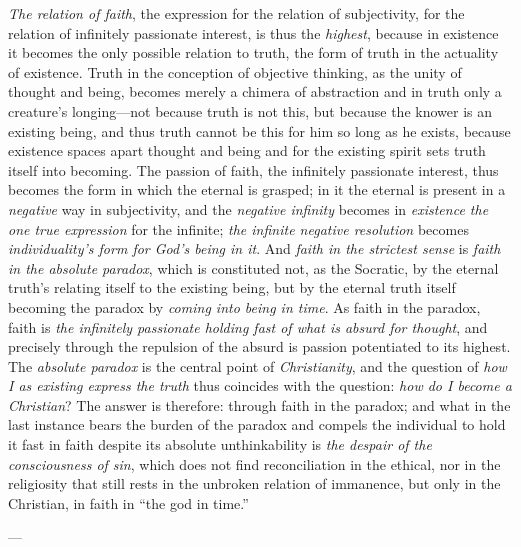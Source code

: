\documentclass[12pt,a4paper]{book}
\begin{document}
\emph{The relation of faith}, the expression for the relation of subjectivity,
for the relation of infinitely passionate interest, is thus the
\emph{highest}, because in existence it becomes the only possible relation to
truth, the form of truth in the actuality of existence. Truth in the
conception of objective thinking, as the unity of thought and being,
becomes merely a chimera of abstraction and in truth only a creature's
longing---not because truth is not this, but because the knower is an
existing being, and thus truth cannot be this for him so long as he
exists, because existence spaces apart thought and being and for the
existing spirit sets truth itself into becoming. The passion of faith,
the infinitely passionate interest, thus becomes the form in which the
eternal is grasped; in it the eternal is present in a \emph{negative} way in
subjectivity, and the \emph{negative infinity} becomes in \emph{existence the one
true expression} for the infinite; \emph{the infinite negative resolution}
becomes \emph{individuality's form for God's being in it}. And \emph{faith in the
strictest sense} is \emph{faith in the absolute paradox}, which is constituted
not, as the Socratic, by the eternal truth's relating itself to the
existing being, but by the eternal truth itself becoming the paradox by
\emph{coming into being in time}. As faith in the paradox, faith is \emph{the
infinitely passionate holding fast of what is absurd for thought}, and
precisely through the repulsion of the absurd is passion potentiated to
its highest. The \emph{absolute paradox} is the central point of \emph{Christianity},
and the question of \emph{how I as existing express the truth} thus coincides
with the question: \emph{how do I become a Christian}? The answer is therefore: through
faith in the paradox; and what in the last instance bears the burden of
the paradox and compels the individual to hold it fast in faith despite
its absolute unthinkability is \emph{the despair of the consciousness of sin},
which does not find reconciliation in the ethical, nor in the
religiosity that still rests in the unbroken relation of immanence, but
only in the Christian, in faith in ``the god in time.''

\begin{center}---\end{center}
\end{document}
